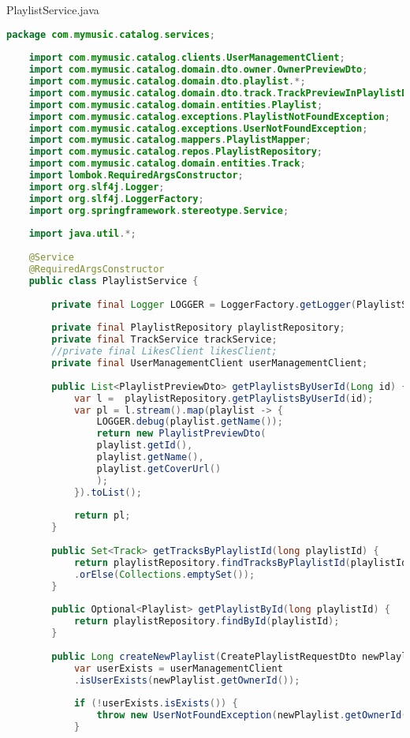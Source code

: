 PlaylistService.java
\begin{lstlisting}[language=java]
	package com.mymusic.catalog.services;
	
	import com.mymusic.catalog.clients.UserManagementClient;
	import com.mymusic.catalog.domain.dto.owner.OwnerPreviewDto;
	import com.mymusic.catalog.domain.dto.playlist.*;
	import com.mymusic.catalog.domain.dto.track.TrackPreviewInPlaylistDto;
	import com.mymusic.catalog.domain.entities.Playlist;
	import com.mymusic.catalog.exceptions.PlaylistNotFoundException;
	import com.mymusic.catalog.exceptions.UserNotFoundException;
	import com.mymusic.catalog.mappers.PlaylistMapper;
	import com.mymusic.catalog.repos.PlaylistRepository;
	import com.mymusic.catalog.domain.entities.Track;
	import lombok.RequiredArgsConstructor;
	import org.slf4j.Logger;
	import org.slf4j.LoggerFactory;
	import org.springframework.stereotype.Service;
	
	import java.util.*;
	
	@Service
	@RequiredArgsConstructor
	public class PlaylistService {
		
		private final Logger LOGGER = LoggerFactory.getLogger(PlaylistService.class);
		
		private final PlaylistRepository playlistRepository;
		private final TrackService trackService;
		//private final LikesClient likesClient;
		private final UserManagementClient userManagementClient;
		
		public List<PlaylistPreviewDto> getPlaylistsByUserId(Long id) {
			var l =  playlistRepository.getPlaylistsByUserId(id);
			var pl = l.stream().map(playlist -> {
				LOGGER.debug(playlist.getName());
				return new PlaylistPreviewDto(
				playlist.getId(),
				playlist.getName(),
				playlist.getCoverUrl()
				);
			}).toList();
			
			return pl;
		}
		
		public Set<Track> getTracksByPlaylistId(long playlistId) {
			return playlistRepository.findTracksByPlaylistId(playlistId)
			.orElse(Collections.emptySet());
		}
		
		public Optional<Playlist> getPlaylistById(long playlistId) {
			return playlistRepository.findById(playlistId);
		}
		
		public Long createNewPlaylist(CreatePlaylistRequestDto newPlaylist) throws Exception {
			var userExists = userManagementClient
			.isUserExists(newPlaylist.getOwnerId());
			
			if (!userExists.isExists()) {
				throw new UserNotFoundException(newPlaylist.getOwnerId());
			}
			

\end{lstlisting}
